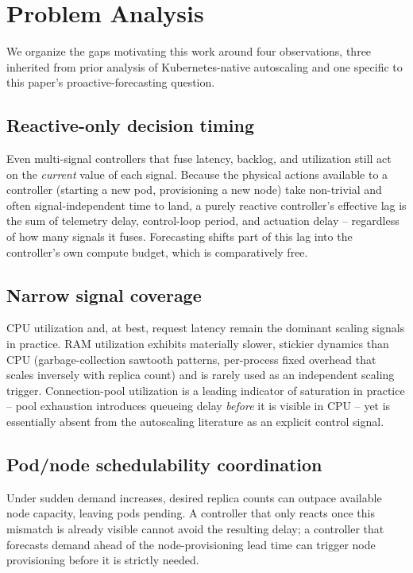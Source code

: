 \documentclass[conference]{IEEEtran}
\begin{document}
\section{Problem Analysis}

We organize the gaps motivating this work around four observations, three inherited from prior
analysis of Kubernetes-native autoscaling and one specific to this paper's proactive-forecasting
question.

\subsection{Reactive-only decision timing}
Even multi-signal controllers that fuse latency, backlog, and utilization still act on the
\emph{current} value of each signal. Because the physical actions available to a controller (starting
a new pod, provisioning a new node) take non-trivial and often signal-independent time to land, a
purely reactive controller's effective lag is the sum of telemetry delay, control-loop period, and
actuation delay -- regardless of how many signals it fuses. Forecasting shifts part of this lag into
the controller's own compute budget, which is comparatively free.

\subsection{Narrow signal coverage}
CPU utilization and, at best, request latency remain the dominant scaling signals in practice. RAM
utilization exhibits materially slower, stickier dynamics than CPU (garbage-collection sawtooth
patterns, per-process fixed overhead that scales inversely with replica count) and is rarely used as
an independent scaling trigger. Connection-pool utilization is a leading indicator of saturation in
practice -- pool exhaustion introduces queueing delay \emph{before} it is visible in CPU -- yet is
essentially absent from the autoscaling literature as an explicit control signal.

\subsection{Pod/node schedulability coordination}
Under sudden demand increases, desired replica counts can outpace available node capacity, leaving
pods pending. A controller that only reacts once this mismatch is already visible cannot avoid the
resulting delay; a controller that forecasts demand ahead of the node-provisioning lead time can
trigger node provisioning before it is strictly needed.
\end{document}
